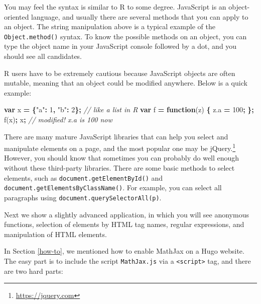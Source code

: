 \documentclass[12pt,]{krantz}
\makeatletter
\newenvironment{Shaded}{\begin{snugshade}}{\end{snugshade}}
\newcommand{\AttributeTok}[1]{\textcolor[rgb]{0.77,0.63,0.00}{#1}}
\newcommand{\CommentTok}[1]{\textcolor[rgb]{0.56,0.35,0.01}{\textit{#1}}}
\newcommand{\DecValTok}[1]{\textcolor[rgb]{0.00,0.00,0.81}{#1}}
\newcommand{\KeywordTok}[1]{\textcolor[rgb]{0.13,0.29,0.53}{\textbf{#1}}}
\newcommand{\NormalTok}[1]{#1}
\newcommand{\OperatorTok}[1]{\textcolor[rgb]{0.81,0.36,0.00}{\textbf{#1}}}
\newcommand{\StringTok}[1]{\textcolor[rgb]{0.31,0.60,0.02}{#1}}
\newcommand{\VariableTok}[1]{\textcolor[rgb]{0.00,0.00,0.00}{#1}}
\renewcommand{\href}[2]{#2\footnote{\url{#1}}}
\newenvironment{kframe}{%
\medskip{}
\setlength{\fboxsep}{.8em}
 \def\at@end@of@kframe{}%
 \ifinner\ifhmode%
  \def\at@end@of@kframe{\end{minipage}}%
  \begin{minipage}{\columnwidth}%
 \fi\fi%
 \def\FrameCommand##1{\hskip\@totalleftmargin \hskip-\fboxsep
 \colorbox{shadecolor}{##1}\hskip-\fboxsep
     \hskip-\linewidth \hskip-\@totalleftmargin \hskip\columnwidth}%
 \MakeFramed {\advance\hsize-\width
   \@totalleftmargin\z@ \linewidth\hsize
   \@setminipage}}%
 {\par\unskip\endMakeFramed%
 \at@end@of@kframe}
\renewenvironment{Shaded}{\begin{kframe}}{\end{kframe}}
\theoremstyle{definition}
\theoremstyle{definition}
\theoremstyle{definition}
\theoremstyle{remark}
\makeatother
\begin{document}
You may feel the syntax is similar to R to some degree. JavaScript is an
object-oriented language, and usually there are several methods that you
can apply to an object. The string manipulation above is a typical
example of the \texttt{Object.method()} syntax. To know the possible
methods on an object, you can type the object name in your JavaScript
console followed by a dot, and you should see all candidates.

R users have to be extremely cautious because JavaScript objects are
often mutable, meaning that an object could be modified anywhere. Below
is a quick example:

\begin{Shaded}
\begin{Highlighting}[]
\KeywordTok{var}\NormalTok{ x }\OperatorTok{=} \OperatorTok{\{}\StringTok{"a"}\OperatorTok{:} \DecValTok{1}\OperatorTok{,} \StringTok{"b"}\OperatorTok{:} \DecValTok{2}\OperatorTok{\};}  \CommentTok{// like a list in R}
\KeywordTok{var}\NormalTok{ f }\OperatorTok{=} \KeywordTok{function}\NormalTok{(z) }\OperatorTok{\{}
  \VariableTok{z}\NormalTok{.}\AttributeTok{a} \OperatorTok{=} \DecValTok{100}\OperatorTok{;}
\OperatorTok{\};}
\AttributeTok{f}\NormalTok{(x)}\OperatorTok{;}
\NormalTok{x}\OperatorTok{;}  \CommentTok{// modified! x.a is 100 now}
\end{Highlighting}
\end{Shaded}

There are many mature JavaScript libraries that can help you select and
manipulate elements on a page, and the most popular one may
be \href{https://jquery.com}{jQuery.} However, you should
know that sometimes you can probably do well enough without these
third-party libraries. There are some basic methods to select elements,
such as \texttt{document.getElementById()} and
\texttt{document.getElementsByClassName()}. For example, you can select
all paragraphs using
\texttt{document.querySelectorAll(\textquotesingle{}p\textquotesingle{})}.

Next we show a slightly advanced application, in which you will see
anonymous functions, selection of elements by HTML tag names, regular
expressions, and manipulation of HTML elements.

In Section \ref{how-to}, we mentioned how to enable
MathJax on a Hugo website. The easy part is to include
the script \texttt{MathJax.js} via a
\texttt{\textless{}script\textgreater{}} tag, and there are two hard
parts:
\end{document}
